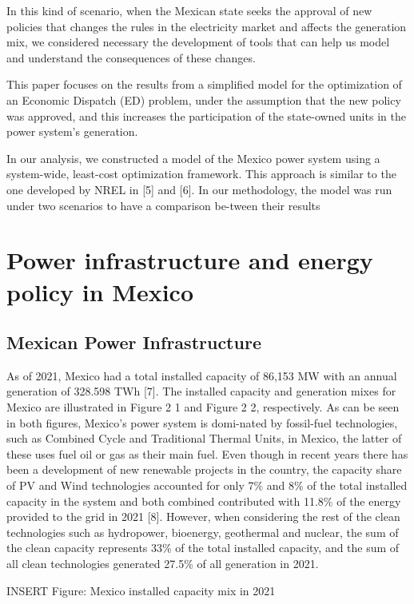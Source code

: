 \documentclass[eng]{ajceam-class}
\begin{document}
In this kind of scenario, when the Mexican state seeks the approval of new policies that changes the rules in the electricity market and affects the generation mix, we considered necessary the development of tools that can help us model and understand the consequences of these changes. 

This paper focuses on the results from a simplified model for the optimization of an Economic Dispatch (ED) problem, under the assumption that the new policy was approved, and this increases the participation of the state-owned units in the power system’s generation.

In our analysis, we constructed a model of the Mexico power system using a system-wide, least-cost optimization framework. This approach is similar to the one developed by NREL in [5] and [6]. In our methodology, the model was run under two scenarios to have a comparison be-tween their results

\section{Power infrastructure and energy policy in Mexico}
\subsection{Mexican Power Infrastructure }

As of 2021, Mexico had a total installed capacity of 86,153 MW with an annual generation of 328.598 TWh [7]. The installed capacity and generation mixes for Mexico are illustrated in Figure 2 1 and Figure 2 2, respectively. As can be seen in both figures, Mexico’s power system is domi-nated by fossil-fuel technologies, such as Combined Cycle and Traditional Thermal Units, in Mexico, the latter of these uses fuel oil or gas as their main fuel. Even though in recent years there has been a development of new renewable projects in the country, the capacity share of PV and Wind technologies accounted for only 7\% and 8\% of the total installed capacity in the system and both combined contributed with 11.8\% of the energy provided to the grid in 2021 [8]. However, when considering the rest of the clean technologies such as hydropower, bioenergy, geothermal and nuclear, the sum of the clean capacity represents 33\% of the total installed capacity, and the sum of all clean technologies generated 27.5\% of all generation in 2021. 

INSERT Figure: Mexico installed capacity mix in 2021
\end{document}
